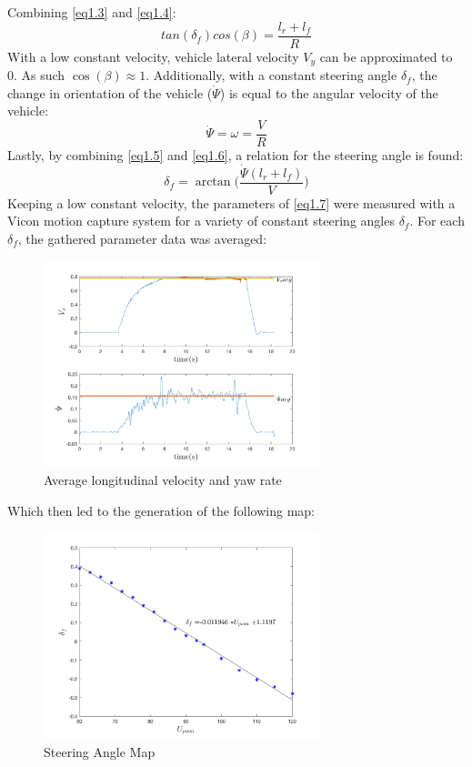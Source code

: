 \documentclass{article}
\numberwithin{equation}{section}
\begin{document}
Combining \eqref{eq1.3} and \eqref{eq1.4}:
\begin{equation} \label{eq1.5}
    tan(\delta_f)cos(\beta) = \frac{l_r+l_f}{R}
\end{equation}
With a low constant velocity, vehicle lateral velocity $V_y$ can be approximated to 0. As such $\cos(\beta)\approx{1}$. 
Additionally, with a constant steering angle $\delta_f$, the change in orientation of the vehicle ($\dot{\Psi}$) is equal to the angular velocity of the vehicle:
\begin{equation}\label{eq1.6}
    \dot{\Psi} = \omega = \frac{V}{R}
\end{equation}
Lastly, by combining \eqref{eq1.5} and \eqref{eq1.6}, a relation for the steering angle is found:
\begin{equation}\label{eq1.7}
    \delta_f = \arctan\bigg(\frac{\dot{\Psi}(l_r+l_f)}{V}\bigg)
\end{equation}
Keeping a low constant velocity, the parameters of \eqref{eq1.7} were measured with a Vicon motion capture system for a variety of constant steering angles $\delta_f$. For each $\delta_f$, the gathered parameter data was averaged: 
\begin{figure}[H]
\centering
\includegraphics[width=8cm]{VelAVG.png}
\caption{Average longitudinal velocity and yaw rate}
\label{fig:VelAVG}
\end{figure}
Which then led to the generation of the following map:
\begin{figure}[H]
\centering
\includegraphics[width=8cm]{SteeringMapping.png}
\caption{Steering Angle Map}
\label{fig:SteeringMap}
\end{figure}
\end{document}
